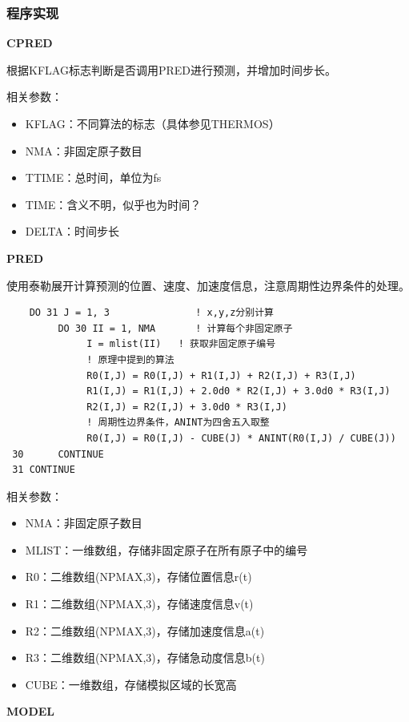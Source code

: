 \documentclass{ctexart}
\begin{document}
\subsubsection{程序实现}

\noindent
\textbf{CPRED}

根据KFLAG标志判断是否调用PRED进行预测，并增加时间步长。

\noindent
相关参数：
\begin{itemize}
    \item KFLAG：不同算法的标志（具体参见THERMOS）
    \item NMA：非固定原子数目
    \item TTIME：总时间，单位为fs
    \item TIME：含义不明，似乎也为时间？
    \item DELTA：时间步长
\end{itemize}

\noindent
\textbf{PRED}

使用泰勒展开计算预测的位置、速度、加速度信息，注意周期性边界条件的处理。

\begin{verbatim}
    DO 31 J = 1, 3               ! x,y,z分别计算
         DO 30 II = 1, NMA       ! 计算每个非固定原子
              I = mlist(II)   ! 获取非固定原子编号
              ! 原理中提到的算法
              R0(I,J) = R0(I,J) + R1(I,J) + R2(I,J) + R3(I,J)
              R1(I,J) = R1(I,J) + 2.0d0 * R2(I,J) + 3.0d0 * R3(I,J)
              R2(I,J) = R2(I,J) + 3.0d0 * R3(I,J)
              ! 周期性边界条件，ANINT为四舍五入取整
              R0(I,J) = R0(I,J) - CUBE(J) * ANINT(R0(I,J) / CUBE(J))
 30      CONTINUE
 31 CONTINUE
\end{verbatim}

\noindent
相关参数：
\begin{itemize}
    \item NMA：非固定原子数目
    \item MLIST：一维数组，存储非固定原子在所有原子中的编号
    \item R0：二维数组(NPMAX,3)，存储位置信息r(t)
    \item R1：二维数组(NPMAX,3)，存储速度信息v(t)
    \item R2：二维数组(NPMAX,3)，存储加速度信息a(t)
    \item R3：二维数组(NPMAX,3)，存储急动度信息b(t)
    \item CUBE：一维数组，存储模拟区域的长宽高
\end{itemize}

\noindent
\textbf{MODEL}
\end{document}
